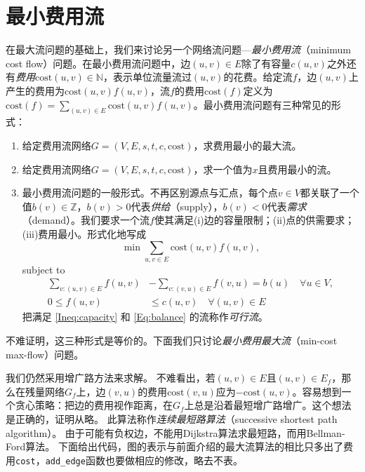 \documentclass[a4paper]{ctexbook}
\newcommand{\cost}{\mathrm{cost}}
\begin{document}
  \section{最小费用流}
  在最大流问题的基础上，我们来讨论另一个网络流问题---\emph{最小费用流}（minimum cost flow）问题。在最小费用流问题中，边$(u,v)\in E$除了有容量$c(u,v)$之外还有\emph{费用}$\cost(u,v)\in\mathbb{N}$，表示单位流量流过$(u,v)$的花费。给定流$f$，边$(u,v)$上产生的费用为$\cost(u,v) f(u,v)$，流$f$的费用$\cost(f)$定义为$\cost(f) = \sum_{(u,v)\in E}\cost(u,v)f(u,v)$。最小费用流问题有三种常见的形式：
  \begin{enumerate}
    \item 给定费用流网络$G=(V,E,s,t,c,\cost)$，求费用最小的最大流。
    \item 给定费用流网络$G=(V,E,s,t,c,\cost)$，求一个值为$x$且费用最小的流。
    \item 最小费用流问题的一般形式。不再区别源点与汇点，每个点$v\in V$都关联了一个值$b(v)\in\mathbb{Z}$，$b(v)>0$代表\emph{供给}（supply），$b(v)<0$代表\emph{需求}（demand）。我们要求一个流$f$使其满足(i)边的容量限制；(ii)点的供需要求；(iii)费用最小。形式化地写成
    \begin{equation}
      \min\sum_{{u,v}\in E}\cost(u,v)f(u,v), \label{mcf-obj}
    \end{equation}
    subject to
    \begin{align}
      \sum_{v\colon(u,v)\in E} f(u,v) &- \sum_{v\colon(v,u)\in E}f(v,u) = b(u) \quad \forall u\in V,\label{Ineq:capacity}\\
      0\le f(u,v)&\le c(u,v)\quad \forall(u,v)\in E\label{Eq:balance} %
    \end{align}
    把满足 \eqref{Ineq:capacity} 和 \eqref{Eq:balance} 的流称作\emph{可行流}。
  \end{enumerate}
  不难证明，这三种形式是等价的。下面我们只讨论\emph{最小费用最大流}（min-cost max-flow）问题。

  我们仍然采用增广路方法来求解。
  不难看出，若$(u,v)\in E$且$(u,v)\in E_f$，那么在残量网络$G_f$上，边$(v,u)$的费用$\cost(v,u)$应为$-\cost(u,v)$。容易想到一个贪心策略：把边的费用视作距离，在$G_f$上总是沿着最短增广路增广。这个想法是正确的，证明从略。%
  此算法称作\emph{连续最短路算法}（successive shortest path algorithm）。
  由于可能有负权边，不能用Dijkstra算法求最短路，而用Bellman-Ford算法。
  下面给出代码，图的表示与前面介绍的最大流算法的相比只多出了费用\texttt{cost}，\texttt{add\_edge}函数也要做相应的修改，略去不表。
  
\end{document}
